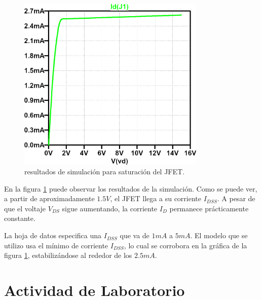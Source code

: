     \begin{figure}[!ht]
      \centering
      \includegraphics[width=0.8\textwidth]{images/saturacion-id_vds.png}
      \caption{resultados de simulación para saturación del JFET.}
      \label{fig:sim.sat}
    \end{figure}
    En la figura \ref{fig:sim.sat} puede observar los resultados de la simulación. Como se puede ver, a partir de
    aproximadamente $1.5V$, el JFET llega a su corriente $I_{DSS}$. A pesar de que el voltaje $V_{DS}$ sigue aumentando, la
    corriente $I_D$ permanece prácticamente constante.

    La hoja de datos especifica una $I_{DSS}$ que va de $1mA$ a $5mA$. El modelo que se utilizo usa el mínimo de
    corriente $I_{DSS}$, lo cual se corrobora en la gráfica de la figura \ref{fig:sim.sat}, estabilizándose al rededor
    de los $2.5mA$.

  \section{Actividad de Laboratorio}
